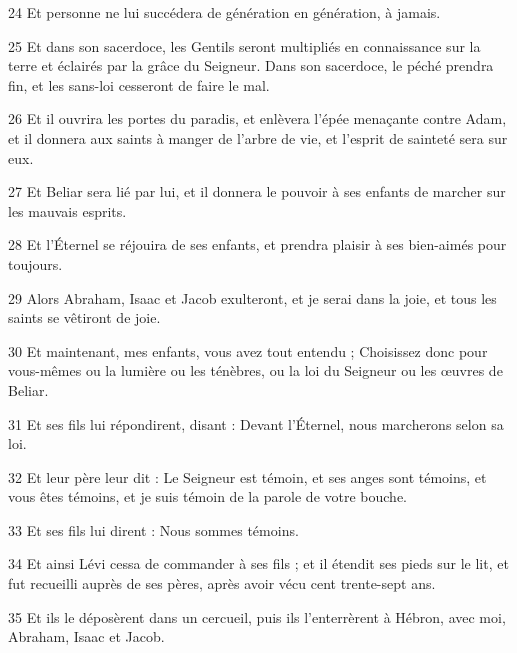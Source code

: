 \par 24 Et personne ne lui succédera de génération en génération, à jamais.

\par 25 Et dans son sacerdoce, les Gentils seront multipliés en connaissance sur la terre et éclairés par la grâce du Seigneur. Dans son sacerdoce, le péché prendra fin, et les sans-loi cesseront de faire le mal.

\par 26 Et il ouvrira les portes du paradis, et enlèvera l'épée menaçante contre Adam, et il donnera aux saints à manger de l'arbre de vie, et l'esprit de sainteté sera sur eux.

\par 27 Et Beliar sera lié par lui, et il donnera le pouvoir à ses enfants de marcher sur les mauvais esprits.

\par 28 Et l'Éternel se réjouira de ses enfants, et prendra plaisir à ses bien-aimés pour toujours.

\par 29 Alors Abraham, Isaac et Jacob exulteront, et je serai dans la joie, et tous les saints se vêtiront de joie.

\par 30 Et maintenant, mes enfants, vous avez tout entendu ; Choisissez donc pour vous-mêmes ou la lumière ou les ténèbres, ou la loi du Seigneur ou les œuvres de Beliar.

\par 31 Et ses fils lui répondirent, disant : Devant l'Éternel, nous marcherons selon sa loi.

\par 32 Et leur père leur dit : Le Seigneur est témoin, et ses anges sont témoins, et vous êtes témoins, et je suis témoin de la parole de votre bouche.

\par 33 Et ses fils lui dirent : Nous sommes témoins.

\par 34 Et ainsi Lévi cessa de commander à ses fils ; et il étendit ses pieds sur le lit, et fut recueilli auprès de ses pères, après avoir vécu cent trente-sept ans.

\par 35 Et ils le déposèrent dans un cercueil, puis ils l'enterrèrent à Hébron, avec moi, Abraham, Isaac et Jacob.


